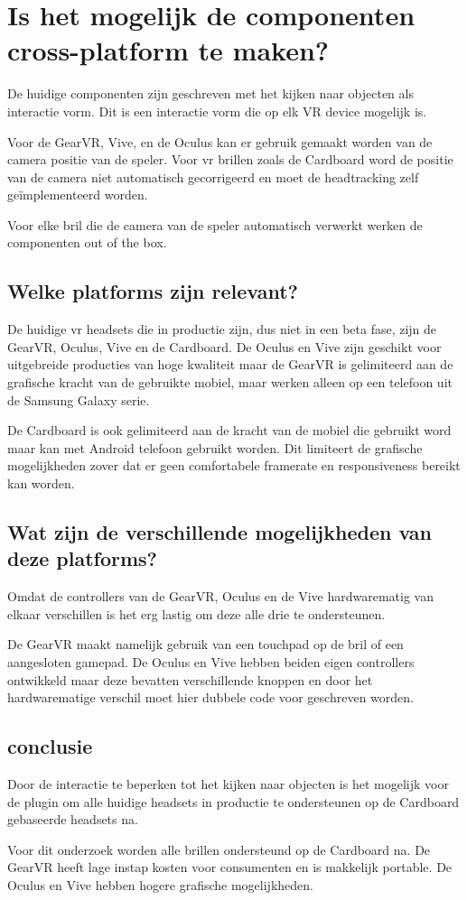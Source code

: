 \section{Is het mogelijk de componenten cross-platform te maken?}
De huidige componenten zijn geschreven met het kijken naar objecten als interactie vorm. Dit is een interactie vorm die op elk VR device mogelijk is. 

Voor de GearVR, Vive, en de Oculus kan er gebruik gemaakt worden van de camera positie van de speler. Voor \gls{vr} brillen zoals de Cardboard word de positie van de camera niet automatisch gecorrigeerd en moet de headtracking zelf geïmplementeerd worden. 

Voor elke bril die de camera van de speler automatisch verwerkt werken de componenten out of the box.

\subsection{Welke platforms zijn relevant?}
\label{subsec:platforms}
De huidige \gls{vr} headsets die in productie zijn, dus niet in een beta fase, zijn de GearVR, Oculus, Vive en de Cardboard. De Oculus en Vive zijn geschikt voor uitgebreide producties van hoge kwaliteit maar de GearVR is gelimiteerd aan de grafische kracht van de gebruikte mobiel, maar werken alleen op een telefoon uit de Samsung Galaxy serie. 

De Cardboard is ook gelimiteerd aan de kracht van de mobiel die gebruikt word maar kan met Android telefoon gebruikt worden. Dit limiteert de grafische mogelijkheden zover dat er geen comfortabele framerate en responsiveness bereikt kan worden.

\subsection{Wat zijn de verschillende mogelijkheden van deze platforms?}
Omdat de controllers van de GearVR, Oculus en de Vive hardwarematig van elkaar verschillen is het erg lastig om deze alle drie te ondersteunen. 

De GearVR maakt namelijk gebruik van een touchpad op de bril of een aangesloten gamepad. De Oculus en Vive hebben beiden eigen controllers ontwikkeld maar deze bevatten verschillende knoppen en door het hardwarematige verschil moet hier dubbele code voor geschreven worden.

\subsection{conclusie}
Door de interactie te beperken tot het kijken naar objecten is het mogelijk voor de plugin om alle huidige headsets in productie te ondersteunen op de Cardboard gebaseerde headsets na.

Voor dit onderzoek worden alle brillen ondersteund op de Cardboard na. De GearVR heeft lage instap kosten voor consumenten en is makkelijk portable. De Oculus en Vive hebben hogere grafische mogelijkheden.